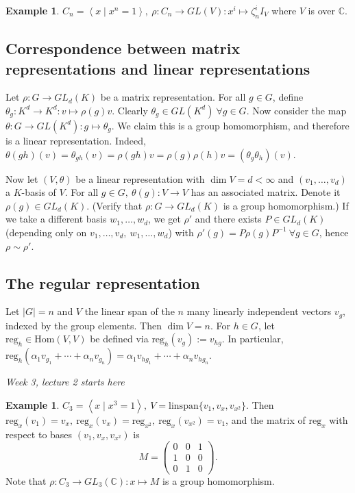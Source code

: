 \documentclass[a4paper]{article}
\newcommand{\la}{\left\langle}
\newcommand{\ra}{\right\rangle}
\newcommand{\C}{\mathbb{C}}
\newcommand{\reg}{\text{reg}}
\newcommand{\Hom}{\text{Hom}}
\theoremstyle{definition}
\newtheorem{example}[defn]{Example}
\begin{document}
\begin{example}
$C_n=\la x \mid x^n=1\ra,\ \rho:C_n\rightarrow GL(V):x^i\mapsto\zeta_n^i I_V$ where $V$ is over $\C$.
\end{example}

\subsection{Correspondence between matrix representations and linear representations}
Let $\rho:G\rightarrow GL_d(K)$ be a matrix representation. For all $g\in G$, define $\theta_g:K^d\rightarrow K^d:v\mapsto \rho(g)v$. Clearly $\theta_g\in GL(K^d) \ \forall g\in G$. Now consider the map $\theta:G\rightarrow GL(K^d):g\mapsto\theta_g$. We claim this is a group homomorphism, and therefore is a linear representation. Indeed, $\theta(gh)(v)=\theta_{gh}(v)=\rho(gh)v=\rho(g)\rho(h)v=(\theta_g\theta_h)(v)$.

Now let $(V,\theta)$ be a linear representation with $\dim V=d<\infty$ and $(v_1,\ldots,v_d)$ a $K$-basis of $V$. For all $g\in G,\ \theta(g):V\rightarrow V$ has an associated matrix. Denote it $\rho(g)\in GL_d(K)$. (Verify that $\rho:G\rightarrow GL_d(K)$ is a group homomorphism.) If we take a different basis $w_1,\ldots,w_d$, we get $\rho'$ and there exists $P\in GL_d(K)$ (depending only on $v_1,\ldots,v_d,\ w_1,\ldots,w_d$) with $\rho'(g)=P\rho(g)P^{-1}\ \forall g\in G$, hence $\rho\sim\rho'$.

\subsection{The regular representation}
\label{subsection:regrep}
Let $|G|=n$ and $V$ the linear span of the $n$ many linearly independent vectors $v_g$, indexed by the group elements. Then $\dim V=n$. For $h\in G$, let $\reg_h\in\Hom(V,V)$ be defined via $\reg_h(v_g):=v_{hg}$. In particular, $\reg_h(\alpha_1v_{g_1}+\cdots+\alpha_nv_{g_n})=\alpha_1v_{hg_1}+\cdots+\alpha_nv_{hg_n}.$

\begin{flushright}
\textit{Week 3, lecture 2 starts here}
\end{flushright}

\begin{example}
$C_3=\la x\mid x^3=1\ra,\ V=\text{linspan}\{v_1,v_x,v_{x^2}\}$. Then $\reg_x(v_1)=v_x,\ \reg_x(v_x)=\reg_{x^2},\ \reg_x(v_{x^2})=v_1$, and the matrix of $\reg_x$ with respect to bases $(v_1,v_x,v_{x^2})$ is
\[
M=\begin{pmatrix}0&0&1\\1&0&0\\0&1&0\end{pmatrix}.
\]
Note that $\rho:C_3\rightarrow GL_3(\C):x\mapsto M$ is a group homomorphism.
\end{example}
\end{document}
